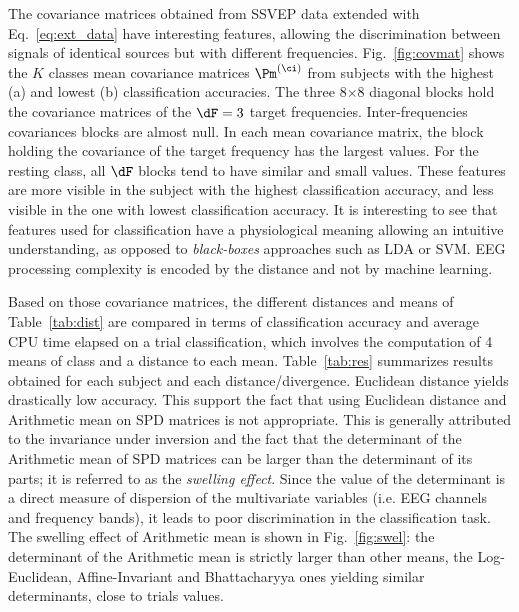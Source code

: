 {%
The covariance matrices obtained from SSVEP data extended with Eq.~\eqref{eq:ext_data} have interesting features, allowing the discrimination between signals of identical sources but with different frequencies. 
Fig.~\ref{fig:covmat} shows the $K$ classes mean covariance matrices $\Pm^{(\ci)}$ from subjects with the highest (a) and lowest (b) classification accuracies. 
The three 8$\times$8 diagonal blocks hold the covariance matrices of the $\dF=3$ target frequencies.
Inter-frequencies covariances blocks are almost null.
In each mean covariance matrix, the block holding the covariance of the target frequency has the largest values. 
For the resting class, all $\dF$ blocks tend to have similar and small values. These features are more visible in the subject with the highest classification accuracy, and less visible in the one with lowest classification accuracy. 
It is interesting to see that features used for classification have a physiological meaning allowing an intuitive understanding, as opposed to \emph{black-boxes} approaches such as LDA or SVM. EEG processing complexity is encoded by the distance and not by machine learning.

Based on those covariance matrices, the different distances and means of Table~\ref{tab:dist} are compared in terms of classification accuracy and average CPU time elapsed on a trial classification, which involves the computation of 4 means of class and a distance to each mean.
Table~\ref{tab:res} summarizes results obtained for each subject and each distance/divergence.
Euclidean distance yields drastically low accuracy. 
This support the fact that using Euclidean distance and Arithmetic mean on SPD matrices is not appropriate. 
This is generally attributed to the invariance under inversion and the fact that the determinant of the Arithmetic mean of SPD matrices can be larger than the determinant of its parts; it is referred to as the \textit{swelling effect}.
Since the value of the determinant is a direct measure of dispersion of the multivariate variables (i.e. EEG channels and frequency bands), it leads to poor discrimination in the classification task. 
The swelling effect of Arithmetic mean is shown in Fig.~\ref{fig:swel}: the determinant of the Arithmetic mean is strictly larger than other means, the Log-Euclidean, Affine-Invariant and Bhattacharyya ones yielding similar determinants, close to trials values.

}
